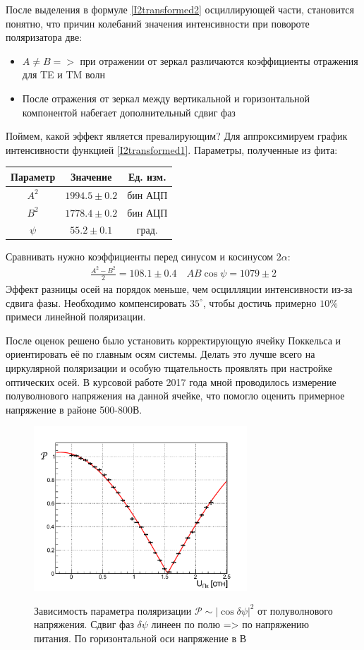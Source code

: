 \documentclass[12pt]{article}
\begin{document}
После выделения в формуле \ref{I2transformed2} осциллирующей части, становится понятно, что причин колебаний значения интенсивности при повороте поляризатора две:
\begin{itemize}
	\item  $A \neq B =>$ при отражении от зеркал различаются коэффициенты отражения для TE и TM волн
	\item После отражения от зеркал между вертикальной и горизонтальной компонентой набегает дополнительный сдвиг фаз
\end{itemize}
Поймем, какой эффект является превалирующим? Для аппроксимируем график интенсивности функцией \ref{I2transformed1}.
Параметры, полученные из фита: 
\begin{center}
	\begin{tabular}{|c|c|c|} 
		\hline
		Параметр & Значение & Ед. изм.\\
		\hline
		$A^2$ & $1994.5\pm0.2$ & бин АЦП \\ 
		\hline
	 	$B^2$ & $1778. 4\pm0.2$ & бин АЦП \\ 
		\hline
		$\psi$ & $55.2\pm0.1$ & град. \\
		\hline
	\end{tabular}
\end{center}
Сравнивать нужно коэффициенты перед синусом и косинусом $2\alpha$:
\begin{align}
	\frac{A^2 - B^2}{2} = 108.1\pm 0.4 \quad AB \cos \psi = 1079\pm 2 
	\label{errors}	
\end{align}
Эффект разницы осей на порядок меньше, чем осцилляции интенсивности из-за сдвига фазы. Необходимо компенсировать $35^{\circ}$, чтобы достичь примерно $10\%$ примеси линейной поляризации. \par
После оценок решено было установить корректирующую ячейку Поккельса и ориентировать её по главным осям системы. Делать это лучше всего на циркулярной поляризации и особую тщательность проявлять при настройке оптических осей. В курсовой работе 2017 года мной проводилось измерение полуволнового напряжения на данной ячейке, что помогло оценить примерное напряжение в районе 500-800В. 
\begin{center}
	\begin{figure}[H]
		\includegraphics[width=8cm]{img/dphi2U_Pokkels.pdf}
		\label{fig:dphi2U_Pokkels}
		\caption{Зависимость параметра поляризации $\mathcal{P}\sim |\cos \delta \psi|^2$ от полуволнового напряжения. Сдвиг фаз $\delta \psi$ линеен по полю => по напряжению питания. По горизонтальной оси напряжение в В}
	\end{figure}
\end{center}
\end{document}
